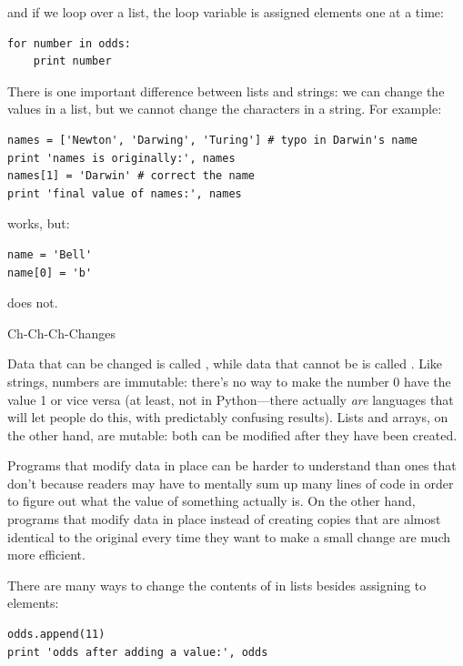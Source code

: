 \documentclass{book}
\begin{document}
and if we loop over a list, the loop variable is assigned elements one
at a time:

\begin{verbatim}
for number in odds:
    print number
\end{verbatim}

There is one important difference between lists and strings: we can
change the values in a list, but we cannot change the characters in a
string. For example:

\begin{verbatim}
names = ['Newton', 'Darwing', 'Turing'] # typo in Darwin's name
print 'names is originally:', names
names[1] = 'Darwin' # correct the name
print 'final value of names:', names
\end{verbatim}

works, but:

\begin{verbatim}
name = 'Bell'
name[0] = 'b'
\end{verbatim}

does not.

\begin{swcbox}{Ch-Ch-Ch-Changes}

Data that can be changed is called , while
data that cannot be is called . Like
strings, numbers are immutable: there's no way to make the number 0 have
the value 1 or vice versa (at least, not in Python---there actually
\emph{are} languages that will let people do this, with predictably
confusing results). Lists and arrays, on the other hand, are mutable:
both can be modified after they have been created.

Programs that modify data in place can be harder to understand than ones
that don't because readers may have to mentally sum up many lines of
code in order to figure out what the value of something actually is. On
the other hand, programs that modify data in place instead of creating
copies that are almost identical to the original every time they want to
make a small change are much more efficient.

\end{swcbox}

There are many ways to change the contents of in lists besides assigning
to elements:

\begin{verbatim}
odds.append(11)
print 'odds after adding a value:', odds
\end{verbatim}
\end{document}
